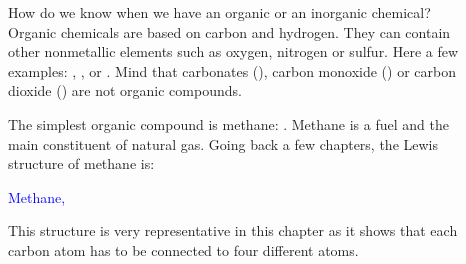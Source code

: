 \documentclass[main.tex]{subfiles}
\begin{document}
\begin{description}
\item[] How do we know when we have an organic or an inorganic chemical? Organic chemicals are based on carbon and hydrogen. They can contain other nonmetallic elements such as oxygen, nitrogen or sulfur. Here a few examples: , ,  or . Mind that carbonates (), carbon monoxide () or carbon dioxide () are not organic compounds. 

\item[] The simplest organic compound is methane: . Methane is a fuel and the main constituent of natural gas. Going back a few chapters, the Lewis structure of methane is:
\begin{center}\hspace{0.5cm}\textcolor{blue}{Methane, }\end{center}
This structure is very representative in this chapter as it shows that each carbon atom has to be connected to four different atoms.


\end{description}
\end{document}
